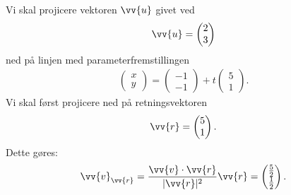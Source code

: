 \begin{exa}
Vi skal projicere vektoren $\vv{u}$ givet ved
\begin{align*}
	\vv{u}=
	\begin{pmatrix}
		2 \\ 3
	\end{pmatrix}
\end{align*}
ned på linjen med parameterfremstillingen 
\begin{align*}
	\begin{pmatrix}
		x \\ y
	\end{pmatrix} =
	\begin{pmatrix}
		-1 \\ -1
	\end{pmatrix}+ t
	\begin{pmatrix}
		5 \\ 1
	\end{pmatrix}.
\end{align*}
Vi skal først projicere ned på retningsvektoren
\begin{align*}
	\vv{r} = 
	\begin{pmatrix}
		5 \\ 1
	\end{pmatrix}.
\end{align*}
Dette gøres:
\begin{align*}
	\vv{v}_{\vv{r}} = \frac{\vv{v}\cdot \vv{r}}{|\vv{r}|^2}\vv{r} = 
	\begin{pmatrix}
		\frac{5}{2} \\ \frac{1}{2}	
	\end{pmatrix}.
\end{align*}

\end{exa}

